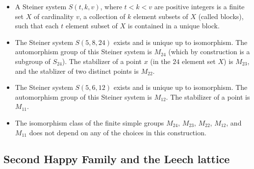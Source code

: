\begin{itemize}
\item A Steiner system $S(t,k,v)$, where $t < k < v$ are positive
  integers is a finite set $X$ of cardinality $v$, a collection of $k$
  element subsets of $X$ (called blocks), such that each $t$ element
  subset of $X$ is contained in a unique block.
\item The Steiner system $S(5,8,24)$ exists and is unique up to
  isomorphism.  The automorphism group of this Steiner system is
  $M_{24}$ (which by construction is a subgroup of $S_{24}$).  The
  stabilizer of a point $x$ (in the $24$ element set $X$) is $M_{23}$,
  and the stablizer of two distinct points is $M_{22}$.
\item The Steiner system $S(5,6,12)$ exists and is unique up to
  isomorphism.  The automorphism group of this Steiner system is
  $M_{12}$.  The stabilizer of a point is $M_{11}$.
\item The isomorphism class of the finite simple groups $M_{24}$,
  $M_{23}$, $M_{22}$, $M_{12}$, and $M_{11}$ does not depend on any of
  the choices in this construction.
\end{itemize}

\subsection{Second Happy Family and the Leech lattice}

